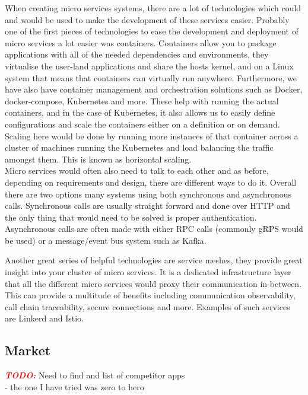 \documentclass{article}
\newcommand{\TODO}{\textbf{\textit{\textcolor{red}{TODO:}}} }
\begin{document}
\begin{multicols}{2}
When creating micro services systems, there are a lot of technologies which could and would be used to make the development of these services easier. Probably one of the first pieces of technologies to ease the development and deployment of micro services a lot easier was containers. Containers allow you to package applications with all of the needed dependencies and environments, they virtualise the user-land applications and share the hosts kernel, and on a Linux system that means that containers can virtually run anywhere. Furthermore, we have also have container management and orchestration solutions such as Docker\cite{Docker}, docker-compose\cite{Docker}, Kubernetes\cite{k8s} and more. These help with running the actual containers, and in the case of Kubernetes, it also allows us to easily define configurations and scale the containers either on a definition or on demand. Scaling here would be done by running more instances of that container across a cluster of machines running the Kubernetes and load balancing the traffic amongst them. This is known as horizontal scaling.\\
Micro services would often also need to talk to each other and as before, depending on requirements and design, there are different ways to do it. Overall there are two options many systems using both synchronous and asynchronous calls. Synchronous calls are usually straight forward and done over HTTP and the only thing that would need to be solved is proper authentication. Asynchronous calls are often made with either RPC calls (commonly gRPS\cite{grpc} would be used) or a message/event bus system such as Kafka\cite{kafka}. 

  Another great series of helpful technologies are service meshes, they provide great insight into your cluster of micro services. It is a dedicated infrastructure layer that all the different micro services would proxy their communication in-between. This can provide a multitude of benefits including communication observability, call chain traceability, secure connections and more. Examples of such services are Linkerd\cite{linkerd} and Istio\cite{istio}.

\subsection{Market} %

\TODO Need to find and list of competitor apps\\
- the one I have tried was zero to hero\\


\end{multicols}
\end{document}
